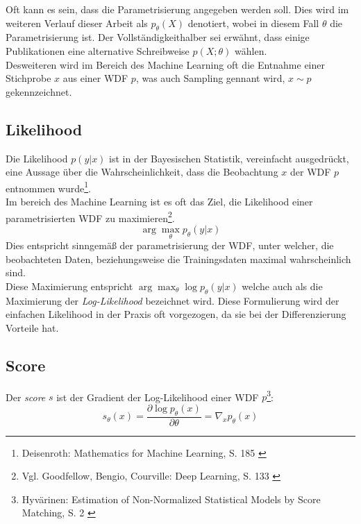 Oft kann es sein, dass die Parametrisierung angegeben werden soll. Dies wird im weiteren Verlauf dieser Arbeit als $p_\theta(X)$ denotiert, wobei in diesem Fall $\theta$ die Parametrisierung ist. Der Vollständigkeithalber sei erwähnt, dass einige Publikationen eine alternative Schreibweise $p(X; \theta)$ wählen. \\
Desweiteren wird im Bereich des Machine Learning oft die Entnahme einer Stichprobe $x$ aus einer WDF $p$, was auch Sampling gennant wird, $x \sim p$ gekennzeichnet. 




\subsection{Likelihood}

Die Likelihood $p(y|x)$ ist in der Bayesischen Statistik, vereinfacht ausgedrückt, eine Aussage über die Wahrscheinlichkeit, dass die Beobachtung $x$ der WDF $p$ entnommen wurde\footnote{
    Deisenroth: Mathematics for Machine Learning, S. 185
    \cite{Deisenroth2020}
}. \\
Im bereich des Machine Learning ist es oft das Ziel, die Likelihood einer parametrisierten WDF zu maximieren\footnote{
    Vgl. Goodfellow, Bengio, Courville: Deep Learning, S. 133
    \cite{Goodfellow-et-al-2016}
}. 
\begin{equation}
    \arg\max_\theta p_\theta(y|x)
\end{equation}
Dies entspricht sinngemäß der parametrisierung der WDF, unter welcher, die beobachteten Daten, beziehungsweise die Trainingsdaten maximal wahrscheinlich sind. \\
Diese Maximierung entspricht $\arg\max_\theta \log p_\theta(y|x)$ welche auch als die Maximierung der \textit{Log-Likelihood} bezeichnet wird. Diese Formulierung wird der einfachen Likelihood in der Praxis oft vorgezogen, da sie bei der Differenzierung Vorteile hat.

\subsection{Score}

Der \textit{score} $s$ ist der Gradient der Log-Likelihood einer WDF $p$\footnote{
    Hyvärinen: Estimation of Non-Normalized Statistical Models by Score Matching, S. 2
    \cite{JMLR:v6:hyvarinen05a}
}: 
\begin{equation}
    s_\theta(x) = \frac{\partial \log p_\theta(x)}{\partial \theta} 
    = \nabla_x p_\theta(x)
\end{equation}

